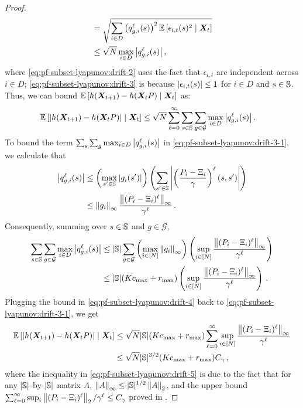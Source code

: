 \begin{proof}
\begin{align}
    \label{eq:pf-subset-lyapunov:drift-2}
    &= \sqrt{\sum_{i\in D} \left(q_{g,i}^{\ell}(s)\right)^2\mathbb{E}\left[\epsilon_{i,t}(s)^2\;\middle|\;{\bm{X}}_t\right]}\\
    \label{eq:pf-subset-lyapunov:drift-3}
    &\leq \sqrt{N} \max_{i\in D} \left\lvert q_{g,i}^{\ell}(s)\right\rvert,
\end{align}
where \eqref{eq:pf-subset-lyapunov:drift-2} uses the fact that $\epsilon_{i,t}$ are independent across $i\in D$; \eqref{eq:pf-subset-lyapunov:drift-3} is because $\left\lvert\epsilon_{i,t}(s)\right\rvert \leq 1$ for $i\in D$ and $s\in \mathbb{S}$. 
Thus, we can bound $\mathbb{E}\left[h({\bm{X}}_{t+1})-h({\bm{X}}_tP)\;\middle|\;{\bm{X}}_t\right]$ as:
\begin{align}
    \label{eq:pf-subset-lyapunov:drift-3-1}
    \mathbb{E}\left[\left\lvert h({\bm{X}}_{t+1})-h({\bm{X}}_tP)\right\rvert\;\middle|\;{\bm{X}}_t\right]
    &\leq \sqrt{N} \sum_{\ell=0}^\infty \sum_{s\in\mathbb{S}}  \sum_{g\in \mathcal{G}} \max_{i\in D} \left\lvert q_{g,i}^{\ell}(s)\right\rvert. 
\end{align}
To bound the term $\sum_s  \sum_{g} \max_{i\in D} \left\lvert q_{g,i}^{\ell}(s)\right\rvert$ in \eqref{eq:pf-subset-lyapunov:drift-3-1}, we calculate that
\begin{align*}
    \left\lvert q_{g,i}^{\ell}(s)\right\rvert&\leq 
    \left(\max_{s'\in\mathbb{S}} \left\lvert g_i(s')\right\rvert\right)\left(\sum_{s'\in\mathbb{S}}\left\lvert\left(\frac{P_i-\Xi_i}{\gamma}\right)^{\ell}(s,s')\right\rvert\right)\\
    &\leq\left\lVert g_i\right\rVert_{\infty}\frac{\left\lVert(P_i-\Xi_i)^{\ell}\right\rVert_{\infty}}{\gamma^{\ell}} \,.
\end{align*}
Consequently, summing over $s\in\mathbb{S}$ and $g\in \mathcal{G}$, 
\begin{align}
    \nonumber
    \sum_{s\in \mathbb{S}}\sum_{g\in \mathcal{G}}\max_{i\in D}\left\lvert q_{g,i}^{\ell}(s)\right\rvert&\leq \lvert\mathbb{S}\rvert \sum_{g\in \mathcal{G}} \left(\max_{i\in [N]}\left\lVert g_i\right\rVert_{\infty}\right)\left(\sup_{i\in[N]} \frac{\left\lVert(P_i-\Xi_i)^{\ell}\right\rVert_{\infty}}{\gamma^{\ell}} \right)\\
    \label{eq:pf-subset-lyapunov:drift-4}
    &\leq \lvert\mathbb{S}\rvert(Kc_{\max}+r_{\max})\left(\sup_{i\in[N]} \frac{\left\lVert(P_i-\Xi_i)^{\ell}\right\rVert_{\infty}}{\gamma^{\ell}} \right)\,.
\end{align}
Plugging the bound in \eqref{eq:pf-subset-lyapunov:drift-4}  back to \eqref{eq:pf-subset-lyapunov:drift-3-1}, we get 
\begin{align}
     \nonumber
    \mathbb{E}\left[\left\lvert h({\bm{X}}_{t+1})-h({\bm{X}}_tP)\right\rvert\;\middle|\;{\bm{X}}_t\right] &\leq \sqrt{N} \lvert\mathbb{S}\rvert (Kc_{\max}+r_{\max})\sum_{\ell=0}^\infty \sup_{i\in[N]} \frac{\left\lVert(P_i-\Xi_i)^{\ell}\right\rVert_{\infty}}{\gamma^{\ell}}\\
     \label{eq:pf-subset-lyapunov:drift-5}
    &\leq \sqrt{N} \lvert\mathbb{S}\rvert^{3/2} (Kc_{\max}+r_{\max})C_{\gamma}\,,
\end{align}
where the inequality in \eqref{eq:pf-subset-lyapunov:drift-5} is due to the fact that for any $\lvert\mathbb{S}\rvert$-by-$\lvert\mathbb{S}\rvert$ matrix $A$, $\left\lVert A\right\rVert_\infty \leq \lvert\mathbb{S}\rvert^{1/2} \left\lVert A\right\rVert_2$, and the upper bound $\sum_{\ell=0}^\infty \sup_{i} \left\lVert(P_i-\Xi_i)^{\ell}\right\rVert_{2} / \gamma^{\ell} \leq C_{\gamma}$ proved in . 


\end{proof}
